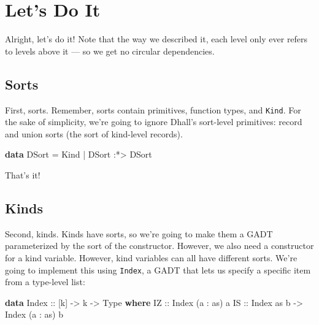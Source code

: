 \documentclass[]{article}
\newenvironment{Shaded}{}{}
\newcommand{\DataTypeTok}[1]{\textcolor[rgb]{0.56,0.13,0.00}{#1}}
\newcommand{\KeywordTok}[1]{\textcolor[rgb]{0.00,0.44,0.13}{\textbf{#1}}}
\newcommand{\NormalTok}[1]{#1}
\newcommand{\OperatorTok}[1]{\textcolor[rgb]{0.40,0.40,0.40}{#1}}
\newcommand{\OtherTok}[1]{\textcolor[rgb]{0.00,0.44,0.13}{#1}}
\begin{document}
\section{Let's Do It}\label{lets-do-it}

Alright, let's do it! Note that the way we described it, each level only ever
refers to levels above it --- so we get no circular dependencies.

\subsection{Sorts}\label{sorts}

First, sorts. Remember, sorts contain primitives, function types, and
\texttt{Kind}. For the sake of simplicity, we're going to ignore Dhall's
sort-level primitives: record and union sorts (the sort of kind-level records).

\begin{Shaded}
\begin{Highlighting}[]
\KeywordTok{data} \DataTypeTok{DSort} \OtherTok{=} \DataTypeTok{Kind}
           \OperatorTok{|} \DataTypeTok{DSort} \OperatorTok{:*\textgreater{}} \DataTypeTok{DSort}
\end{Highlighting}
\end{Shaded}

That's it!

\subsection{Kinds}\label{kinds}

Second, kinds. Kinds have sorts, so we're going to make them a GADT
parameterized by the sort of the constructor. However, we also need a
constructor for a kind variable. However, kind variables can all have different
sorts. We're going to implement this using \texttt{Index}, a GADT that lets us
specify a specific item from a type-level list:

\begin{Shaded}
\begin{Highlighting}[]
\KeywordTok{data} \DataTypeTok{Index}\OtherTok{ ::}\NormalTok{ [k] }\OtherTok{{-}\textgreater{}}\NormalTok{ k }\OtherTok{{-}\textgreater{}} \DataTypeTok{Type} \KeywordTok{where}
    \DataTypeTok{IZ}\OtherTok{ ::} \DataTypeTok{Index}\NormalTok{ (a \textquotesingle{}}\OperatorTok{:}\NormalTok{ as) a}
    \DataTypeTok{IS}\OtherTok{ ::} \DataTypeTok{Index}\NormalTok{ as b }\OtherTok{{-}\textgreater{}} \DataTypeTok{Index}\NormalTok{ (a \textquotesingle{}}\OperatorTok{:}\NormalTok{ as) b}
\end{Highlighting}
\end{Shaded}
\end{document}
